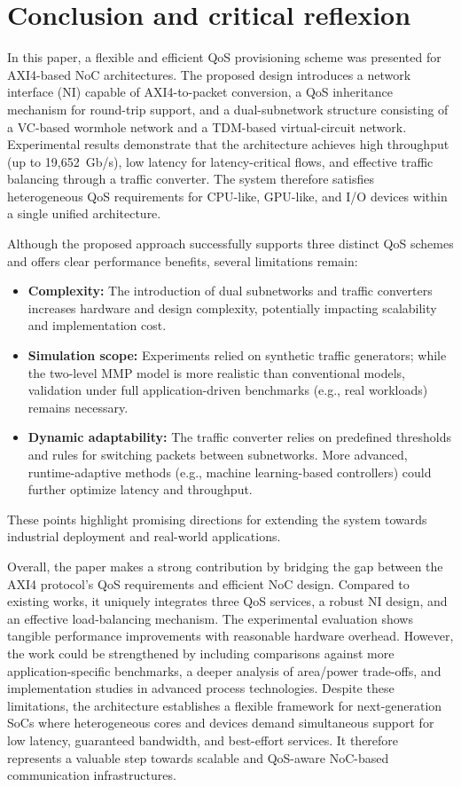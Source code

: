 \chapter{Conclusion and critical reflexion}

In this paper, a flexible and efficient QoS provisioning scheme was presented for AXI4-based NoC architectures. The proposed design introduces a network interface (NI) capable of AXI4-to-packet conversion, a QoS inheritance mechanism for round-trip support, and a dual-subnetwork structure consisting of a VC-based wormhole network and a TDM-based virtual-circuit network.  
Experimental results demonstrate that the architecture achieves high throughput (up to 19{,}652~Gb/s), low latency for latency-critical flows, and effective traffic balancing through a traffic converter. The system therefore satisfies heterogeneous QoS requirements for CPU-like, GPU-like, and I/O devices within a single unified architecture.

Although the proposed approach successfully supports three distinct QoS schemes and offers clear performance benefits, several limitations remain:  
\begin{itemize}
    \item \textbf{Complexity:} The introduction of dual subnetworks and traffic converters increases hardware and design complexity, potentially impacting scalability and implementation cost.  
    \item \textbf{Simulation scope:} Experiments relied on synthetic traffic generators; while the two-level MMP model is more realistic than conventional models, validation under full application-driven benchmarks (e.g., real workloads) remains necessary.  
    \item \textbf{Dynamic adaptability:} The traffic converter relies on predefined thresholds and rules for switching packets between subnetworks. More advanced, runtime-adaptive methods (e.g., machine learning-based controllers) could further optimize latency and throughput.  
\end{itemize}
These points highlight promising directions for extending the system towards industrial deployment and real-world applications.

Overall, the paper makes a strong contribution by bridging the gap between the AXI4 protocol’s QoS requirements and efficient NoC design. Compared to existing works, it uniquely integrates three QoS services, a robust NI design, and an effective load-balancing mechanism. The experimental evaluation shows tangible performance improvements with reasonable hardware overhead. 
However, the work could be strengthened by including comparisons against more application-specific benchmarks, a deeper analysis of area/power trade-offs, and implementation studies in advanced process technologies.  
Despite these limitations, the architecture establishes a flexible framework for next-generation SoCs where heterogeneous cores and devices demand simultaneous support for low latency, guaranteed bandwidth, and best-effort services. It therefore represents a valuable step towards scalable and QoS-aware NoC-based communication infrastructures.
